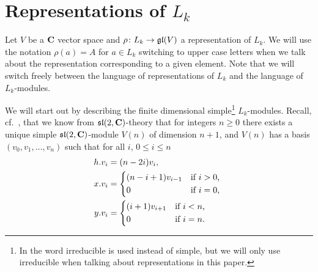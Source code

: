 \section{Representations of \texorpdfstring{$L_k$}{L\_k}}

Let $V$ be a $\mathbf{C}$ vector space and $\rho\colon L_k \to \mathfrak{gl}(V)$ a representation of $L_k$. We will use the notation $\rho(a)=A$ for $a\in L_k$ switching to upper case letters when we talk about the representation corresponding to a given element. Note that we will switch freely between the language of representations of $L_k$ and the language of $L_k$-modules.

We will start out by describing the finite dimensional simple\footnote{In \cite{indecompReprOfLorGr} the word irreducible is used instead of simple, but we will only use irreducible when talking about representations in this paper.} $L_k$-modules. Recall, cf.\ \cite[36]{jantzen}, that we know from $\mathfrak{sl}(2,\mathbf{C})$-theory that for integers $n\geq 0$ there exists a unique simple $\mathfrak{sl}(2,\mathbf{C})$-module $V(n)$ of dimension $n+1$, and $V(n)$ has a basis $(v_0,v_1,\dotsc,v_n)$ such that for all $i$, $0\leq i\leq n$
\begin{align}
  \begin{split}\label{eq:sl2modbasis}
    h.v_i &= (n-2i)v_i, \\
    x.v_i &=
    \begin{dcases*}
      (n-i+1)v_{i-1} & if $i>0$, \\
      0 & if $i=0$,
    \end{dcases*} \\
    y.v_i &=
    \begin{dcases*}
      (i+1)v_{i+1} & if $i<n$, \\
      0 & if $i=n$.
    \end{dcases*}
  \end{split}
\end{align}


